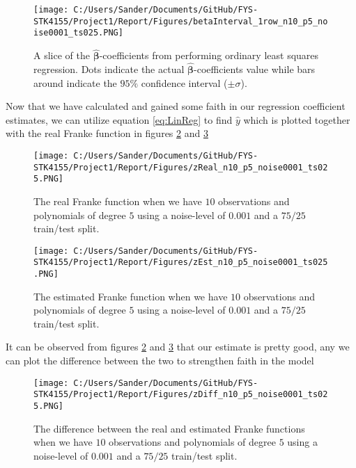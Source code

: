 \documentclass[12pt,a4paper]{article}
\begin{document}
\begin{figure}[H]
\centering
\texttt{[image: C:/Users/Sander/Documents/GitHub/FYS-STK4155/Project1/Report/Figures/betaInterval\_1row\_n10\_p5\_noise0001\_ts025.PNG]}
\caption{\label{fig:betaIntROW1} A slice of the $\hat{\boldsymbol{\beta}}$-coefficients from performing ordinary least squares regression. Dots indicate the actual $\hat{\boldsymbol{\beta}}$-coefficients value while bars around indicate the $95\%$ confidence interval ($\pm \sigma$).}
\end{figure}

\noindent Now that we have calculated and gained some faith in our regression coefficient estimates, we can utilize equation \ref{eq:LinReg} to find $\hat{y}$ which is plotted together with the real Franke function in figures \ref{fig:FrankeReal1} and \ref{fig:FrankeEst1}

\begin{figure}[H]
\centering
\texttt{[image: C:/Users/Sander/Documents/GitHub/FYS-STK4155/Project1/Report/Figures/zReal\_n10\_p5\_noise0001\_ts025.PNG]}
\caption{\label{fig:FrankeReal1} The real Franke function when we have $10$ observations and polynomials of degree $5$ using a noise-level of $0.001$ and a $75/25$ train/test split.}
\end{figure}

\begin{figure}[H]
\centering
\texttt{[image: C:/Users/Sander/Documents/GitHub/FYS-STK4155/Project1/Report/Figures/zEst\_n10\_p5\_noise0001\_ts025.PNG]}
\caption{\label{fig:FrankeEst1} The estimated Franke function when we have $10$ observations and polynomials of degree $5$ using a noise-level of $0.001$ and a $75/25$ train/test split.}
\end{figure}

\noindent It can be observed from figures \ref{fig:FrankeReal1} and \ref{fig:FrankeEst1} that our estimate is pretty good, any we can plot the difference between the two to strengthen faith in the model

\begin{figure}[H]
\centering
\texttt{[image: C:/Users/Sander/Documents/GitHub/FYS-STK4155/Project1/Report/Figures/zDiff\_n10\_p5\_noise0001\_ts025.PNG]}
\caption{\label{fig:FrankeDIFF1} The difference between the real and estimated Franke functions when we have $10$ observations and polynomials of degree $5$ using a noise-level of $0.001$ and a $75/25$ train/test split.}
\end{figure}
\end{document}
